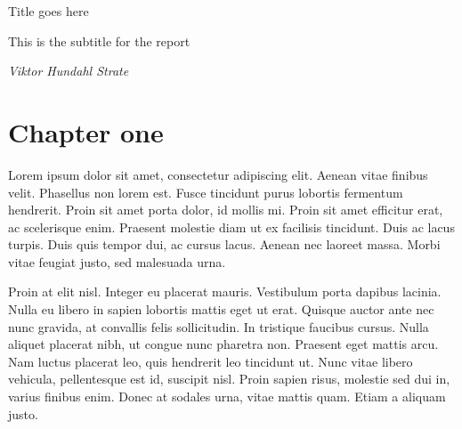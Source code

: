 \documentclass[12pt,a4paper]{article}
\begin{document}
\begin{titlepage}
    \begin{center}
        \vspace*{1.5cm}
        
        \begin{huge}
        \sffamily Title goes here
        \end{huge}
        
        \vspace{2mm}

        \begin{Large}
         This is the subtitle for the report
        \end{Large}
        
        \vspace{8mm}
        
        \textit{Viktor Hundahl Strate}
        
        \vfill
        
        
        \vfill
        
    \end{center}
\end{titlepage}

\tableofcontents

\pagebreak

\section{Chapter one}
Lorem ipsum dolor sit amet, consectetur adipiscing elit. Aenean vitae finibus velit. Phasellus non lorem est. Fusce tincidunt purus lobortis fermentum hendrerit. Proin sit amet porta dolor, id mollis mi. Proin sit amet efficitur erat, ac scelerisque enim. Praesent molestie diam ut ex facilisis tincidunt. Duis ac lacus turpis. Duis quis tempor dui, ac cursus lacus. Aenean nec laoreet massa. Morbi vitae feugiat justo, sed malesuada urna.

Proin at elit nisl. Integer eu placerat mauris. Vestibulum porta dapibus lacinia. Nulla eu libero in sapien lobortis mattis eget ut erat. Quisque auctor ante nec nunc gravida, at convallis felis sollicitudin. In tristique faucibus cursus. Nulla aliquet placerat nibh, ut congue nunc pharetra non. Praesent eget mattis arcu. Nam luctus placerat leo, quis hendrerit leo tincidunt ut. Nunc vitae libero vehicula, pellentesque est id, suscipit nisl. Proin sapien risus, molestie sed dui in, varius finibus enim. Donec at sodales urna, vitae mattis quam. Etiam a aliquam justo.
\end{document}
